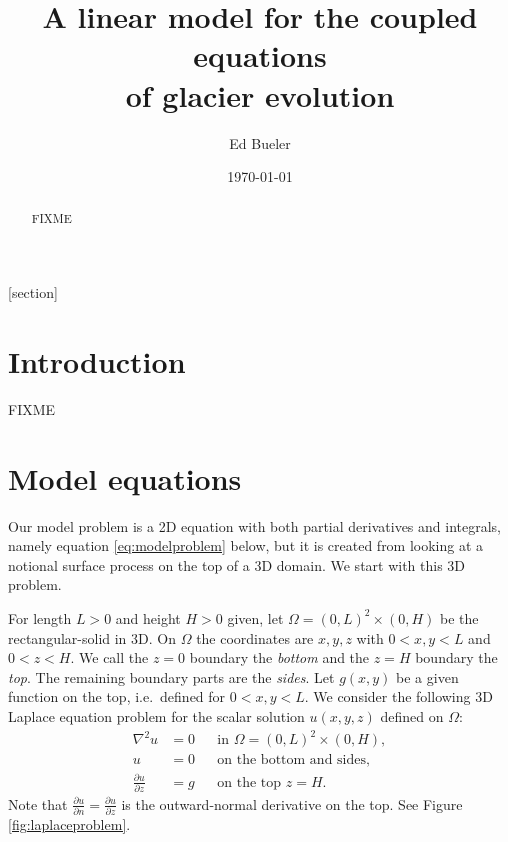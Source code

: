 \documentclass[letterpaper,final,12pt,reqno]{amsart}
\theoremstyle{cstyle}
\theoremstyle{cstyle*}
\theoremstyle{dstyle}
\newcommand{\grad}{\nabla}
\begin{document}
\title[A linear model for the coupled equations of glacier evolution]{A linear model for the coupled equations \\ of glacier evolution}

\author{Ed Bueler}

\date{\today}

\begin{abstract} FIXME
\end{abstract}

\maketitle


\thispagestyle{empty}

[section]


\section{Introduction} \label{sec:intro}

FIXME

\section{Model equations} \label{sec:model}

Our model problem is a 2D equation with both partial derivatives and integrals, namely equation \eqref{eq:modelproblem} below, but it is created from looking at a notional surface process on the top of a 3D domain.  We start with this 3D problem.

For length $L>0$ and height $H>0$ given, let $\Omega = (0,L)^2\times (0,H)$ be the rectangular-solid in 3D.  On $\Omega$ the coordinates are $x,y,z$ with $0<x,y<L$ and $0<z<H$.  We call the $z=0$ boundary the \emph{bottom} and the $z=H$ boundary the \emph{top}.  The remaining boundary parts are the \emph{sides}.  Let $g(x,y)$ be a given function on the top, i.e.~defined for $0<x,y<L$.  We consider the following 3D Laplace equation problem for the scalar solution $u(x,y,z)$ defined on $\Omega$:
\begin{subequations}
\label{eq:laplaceproblem}
\begin{align}
\grad^2 u &= 0 & &\text{in } \Omega = (0,L)^2\times (0,H), \\
u &= 0 & &\text{on the bottom and sides}, \\
\frac{\partial u}{\partial z} &= g & &\text{on the top $z=H$}.
\end{align}
\end{subequations}
Note that $\frac{\partial u}{\partial n}=\frac{\partial u}{\partial z}$ is the outward-normal derivative on the top.  See Figure \ref{fig:laplaceproblem}.
\end{document}
